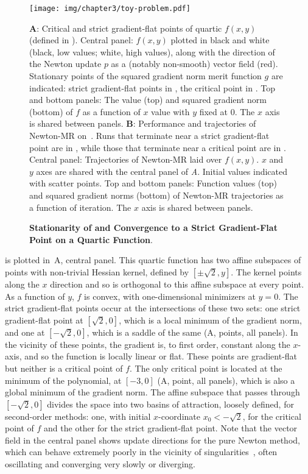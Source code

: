\documentclass[../../thesis.tex]{subfiles}
\begin{document}
\begin{figure}
	\texttt{[image: img/chapter3/toy-problem.pdf]}
	\caption{\textbf{Stationarity of and Convergence to
	a Strict Gradient-Flat Point on a Quartic Function}.}%
	{\textbf{A}:
	Critical and strict gradient-flat points
	of quartic $f(x,y)$ (defined in ).
	Central panel:
	$f(x,y)$
	plotted in black and white
	(black, low values; white, high values),
	along with the direction of the Newton update $p$
	as a (notably non-smooth) vector field (red).
	Stationary points of
	the squared gradient norm merit function $g$ are indicated:
	strict gradient-flat points in \failcolor{},
	the critical point in \successcolor{}.
	Top and bottom panels:
	The value (top) and squared gradient norm (bottom)
	of $f$ as a function of $x$ value
	with $y$ fixed at 0.
	The $x$ axis is shared between panels.
	\textbf{B}:
	Performance and trajectories of Newton-MR
	on~.
	Runs that terminate near a strict gradient-flat point
	are in \failcolor{},
	while those that terminate near
	a critical point are in \successcolor{}.
	Central panel:
	Trajectories of Newton-MR laid over
	$f(x, y)$.
	$x$ and $y$ axes are shared with the central panel of
	\emph{A}.
	Initial values indicated with scatter points.
	Top and bottom panels:
	Function values (top) and squared gradient norms (bottom)
	of Newton-MR trajectories as a function of iteration.
	The $x$ axis is shared between panels.}
\end{figure}

 is plotted in~A,
central panel.
This quartic function has two affine subspaces
of points with non-trivial Hessian kernel,
defined by $[\pm\sqrt{2}, y]$.
The kernel points along the $x$ direction and so
is orthogonal to this affine subspace at every point.
As a function of $y$, $f$ is convex,
with one-dimensional minimizers at $y=0$.
The strict gradient-flat points occur at the intersections
of these two sets:
one strict gradient-flat point at $[\sqrt{2}, 0]$,
which is a local minimum of the gradient norm,
and one at $[-\sqrt{2}, 0]$,
which is a saddle of the same
(A, \failcolor{} points, all panels).
In the vicinity of these points, the gradient is,
to first order, constant along the $x$-axis,
and so the function is locally linear or flat.
These points are gradient-flat but
neither is a critical point of $f$.
The only critical point is located at the minimum of the polynomial,
at $[-3, 0]$
(A, \successcolor{} point, all panels),
which is also a global minimum of the gradient norm.
The affine subspace that passes through
$[-\sqrt{2}, 0]$ divides the space into two
basins of attraction, loosely defined,
for second-order methods:
one, with initial $x$-coordinate $x_0<-\sqrt{2}$,
for the critical point of $f$
and the other for the strict gradient-flat point.
Note that the vector field in the central panel shows update directions
for the pure Newton method,
which can behave extremely poorly in the vicinity
of singularities~\cite{powell1970,griewank1983},
often oscillating and converging very slowly
or diverging.
\end{document}

